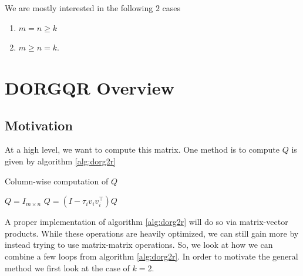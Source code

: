 \documentclass[12pt]{article}
\begin{document}
    We are mostly interested in the following $2$ cases
    \begin{enumerate}
        \item $m=n\geq k$
        \item $m\geq n=k$.
    \end{enumerate}
    \section{DORGQR Overview}
    \subsection{Motivation}
    At a high level, we want to compute this matrix. One method is to compute $Q$ is given by algorithm \ref{alg:dorg2r}

    \begin{algorithm}
        \caption{Column-wise computation of $Q$}\label{alg:dorg2r}
        \begin{algorithmic}[1]
            \STATE $Q= I_{m\times n}$
                \STATE $Q= \left(I-\tau_iv_iv_i^\top\right)Q$
            \ENDFOR
        \end{algorithmic}
    \end{algorithm}

    A proper implementation of algorithm \ref{alg:dorg2r} will do so via matrix-vector products. While these operations
    are heavily optimized, we can still gain more by instead trying to use matrix-matrix
    operations. So, we look at how we can combine a few loops from algorithm \ref{alg:dorg2r}. In order to motivate the general method we first look at the case of $k=2$.
\end{document}
